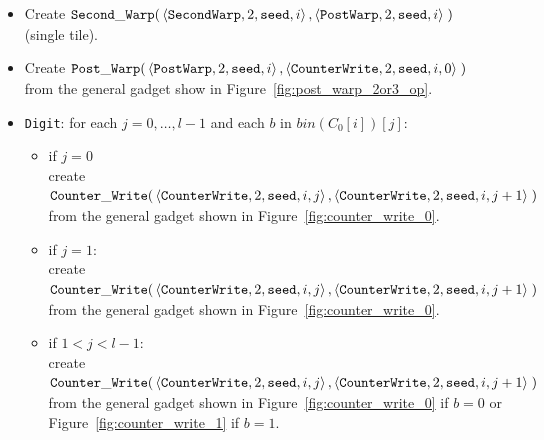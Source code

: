 \begin{itemize}
    \item Create
    $\begin{aligned}[t]
        {\tt Second\_Warp}(&\left\langle {\tt SecondWarp}, 2, {\tt seed}, i \right\rangle,
                     \left\langle {\tt PostWarp},   2, {\tt seed}, i \right\rangle \;)
    \end{aligned}$ (single tile).

    \item Create
    $\begin{aligned}[t]
        {\tt Post\_Warp}(&\left\langle {\tt PostWarp}, 2, {\tt seed}, i    \right\rangle,
                   \left\langle {\tt CounterWrite},    2, {\tt seed}, i, 0 \right\rangle \;)
    \end{aligned}$\\ from the general gadget show in Figure~\ref{fig:post_warp_2or3_op}.

    \item {\tt Digit}: for each $j=0,\ldots,l-1$ and each $b$ in $bin(C_0[i])[j]$:
    \begin{itemize}
        \item if $j = 0$\\ create
        $\begin{aligned}[t]
            {\tt Counter\_Write}(&\left\langle {\tt CounterWrite}, 2, {\tt seed}, i, j \right\rangle, \left\langle {\tt CounterWrite}, 2, {\tt seed}, i, j + 1 \right\rangle \;)
        \end{aligned}$\\from the general gadget shown in Figure~\ref{fig:counter_write_0}.

        \item if $j = 1$:\\ create
        $\begin{aligned}[t]
            {\tt Counter\_Write}(&\left\langle {\tt CounterWrite}, 2, {\tt seed}, i, j \right\rangle, \left\langle {\tt CounterWrite}, 2, {\tt seed}, i, j + 1 \right\rangle \;)
        \end{aligned}$\\from the general gadget shown in Figure~\ref{fig:counter_write_0}.

        \item if $1 < j < l-1$:\\ create
        $\begin{aligned}[t]
            {\tt Counter\_Write}(&\left\langle {\tt CounterWrite}, 2, {\tt seed}, i, j \right\rangle, \left\langle {\tt CounterWrite}, 2, {\tt seed}, i, j + 1 \right\rangle \;)
        \end{aligned}$\\from the general gadget shown in Figure~\ref{fig:counter_write_0} if $b = 0$ or Figure~\ref{fig:counter_write_1} if $b = 1$.


\end{itemize}
\end{itemize}
